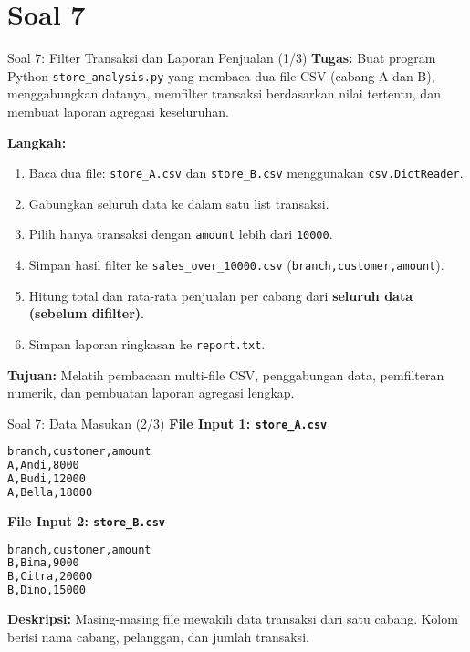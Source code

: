 \documentclass[aspectratio=169, table]{beamer}
\begin{document}
\section{Soal 7}
\begin{frame}[fragile]{Soal 7: Filter Transaksi dan Laporan Penjualan (1/3)}
\vspace{10pt}
\textbf{Tugas:}  
Buat program Python \texttt{store\_analysis.py} yang membaca dua file CSV (cabang A dan B), menggabungkan datanya, memfilter transaksi berdasarkan nilai tertentu, dan membuat laporan agregasi keseluruhan.

\textbf{Langkah:}
\begin{enumerate}
  \item Baca dua file: \texttt{store\_A.csv} dan \texttt{store\_B.csv} menggunakan \texttt{csv.DictReader}.
  \item Gabungkan seluruh data ke dalam satu list transaksi.
  \item Pilih hanya transaksi dengan \texttt{amount} lebih dari \texttt{10000}.
  \item Simpan hasil filter ke \texttt{sales\_over\_10000.csv}  
        (\texttt{branch,customer,amount}).
  \item Hitung total dan rata-rata penjualan per cabang dari \textbf{seluruh data (sebelum difilter)}.
  \item Simpan laporan ringkasan ke \texttt{report.txt}.
\end{enumerate}

\textbf{Tujuan:}  
Melatih pembacaan multi-file CSV, penggabungan data, pemfilteran numerik, dan pembuatan laporan agregasi lengkap.
\end{frame}

\begin{frame}[fragile]{Soal 7: Data Masukan (2/3)}
\vspace{10pt}
\textbf{File Input 1: \texttt{store\_A.csv}}
\begin{lstlisting}[language=bash,basicstyle=\ttfamily\small]
branch,customer,amount
A,Andi,8000
A,Budi,12000
A,Bella,18000
\end{lstlisting}

\textbf{File Input 2: \texttt{store\_B.csv}}
\begin{lstlisting}[language=bash,basicstyle=\ttfamily\small]
branch,customer,amount
B,Bima,9000
B,Citra,20000
B,Dino,15000
\end{lstlisting}

\textbf{Deskripsi:}
  Masing-masing file mewakili data transaksi dari satu cabang.
  Kolom berisi nama cabang, pelanggan, dan jumlah transaksi.
\end{frame}
\end{document}
